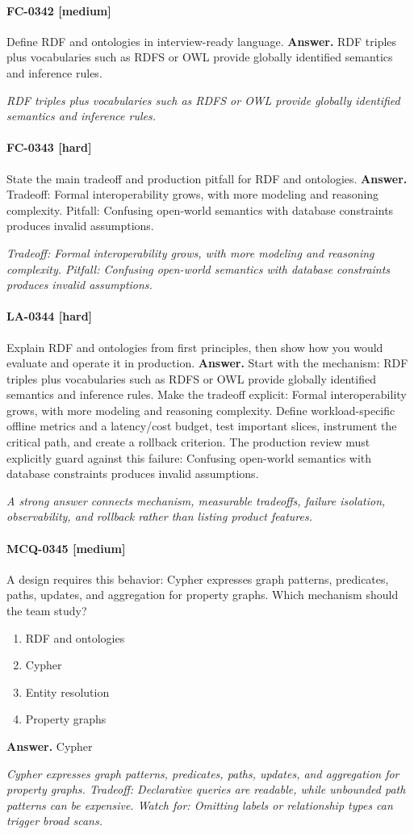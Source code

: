 \paragraph{FC-0342 [medium]} Define RDF and ontologies in interview-ready language.
\noindent\textbf{Answer.} RDF triples plus vocabularies such as RDFS or OWL provide globally identified semantics and inference rules.
\par\textit{RDF triples plus vocabularies such as RDFS or OWL provide globally identified semantics and inference rules.}
\paragraph{FC-0343 [hard]} State the main tradeoff and production pitfall for RDF and ontologies.
\noindent\textbf{Answer.} Tradeoff: Formal interoperability grows, with more modeling and reasoning complexity. Pitfall: Confusing open-world semantics with database constraints produces invalid assumptions.
\par\textit{Tradeoff: Formal interoperability grows, with more modeling and reasoning complexity. Pitfall: Confusing open-world semantics with database constraints produces invalid assumptions.}
\paragraph{LA-0344 [hard]} Explain RDF and ontologies from first principles, then show how you would evaluate and operate it in production.
\noindent\textbf{Answer.} Start with the mechanism: RDF triples plus vocabularies such as RDFS or OWL provide globally identified semantics and inference rules. Make the tradeoff explicit: Formal interoperability grows, with more modeling and reasoning complexity. Define workload-specific offline metrics and a latency/cost budget, test important slices, instrument the critical path, and create a rollback criterion. The production review must explicitly guard against this failure: Confusing open-world semantics with database constraints produces invalid assumptions.
\par\textit{A strong answer connects mechanism, measurable tradeoffs, failure isolation, observability, and rollback rather than listing product features.}
\paragraph{MCQ-0345 [medium]} A design requires this behavior: Cypher expresses graph patterns, predicates, paths, updates, and aggregation for property graphs. Which mechanism should the team study?
\begin{enumerate}[label=\Alph*.]
\item RDF and ontologies
\item Cypher
\item Entity resolution
\item Property graphs
\end{enumerate}
\noindent\textbf{Answer.} Cypher
\par\textit{Cypher expresses graph patterns, predicates, paths, updates, and aggregation for property graphs. Tradeoff: Declarative queries are readable, while unbounded path patterns can be expensive. Watch for: Omitting labels or relationship types can trigger broad scans.}
